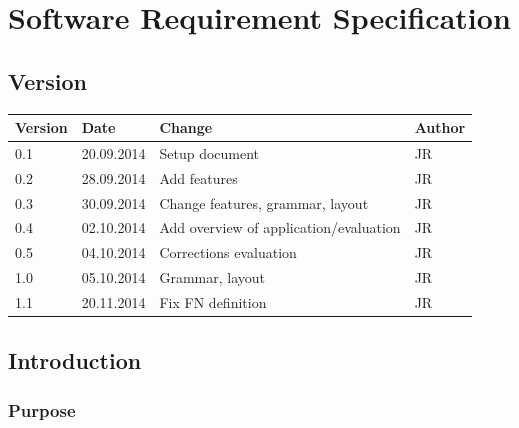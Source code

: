 
\chapter{Software Requirement Specification} %

\label{ChapterX} %



\section{Version}

\begin{tabular}{| p{1.5cm} | p{2cm} | p{9cm} | p{1.5cm} |}
	\hline
	Version & Date 		& Change & Author \\ \hline
	0.1 	& 20.09.2014 	& Setup document  										& JR \\ \hline
	0.2 	& 28.09.2014		& Add features										& JR \\ \hline
	0.3 	& 30.09.2014		& Change features, grammar, layout					& JR \\ \hline
	0.4 	& 02.10.2014		& Add overview of application/evaluation			& JR \\ \hline
	0.5 	& 04.10.2014		& Corrections evaluation 							& JR \\ \hline
	1.0 	& 05.10.2014		& Grammar, layout 									& JR \\ \hline
	1.1 	& 20.11.2014		& Fix FN definition									& JR \\ \hline

\end{tabular}

\section{Introduction}



\subsection{Purpose}

